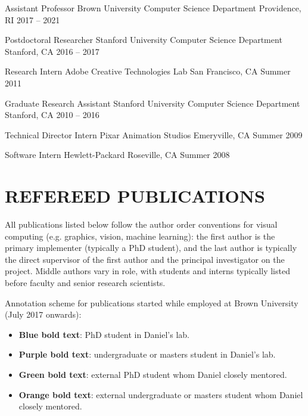 \documentclass[line,margin]{res}
\begin{document}
\begin{resume}
\job
{Assistant Professor}
{Brown University Computer Science Department}
{Providence, RI}
{2017 -- 2021}

\job
{Postdoctoral Researcher}
{Stanford University Computer Science Department}
{Stanford, CA}
{2016 -- 2017}

\job
{Research Intern}
{Adobe Creative Technologies Lab}
{San Francisco, CA}
{Summer 2011}

\job
{Graduate Research Assistant}
{Stanford University Computer Science Department}
{Stanford, CA}
{2010 -- 2016}

\job
{Technical Director Intern}
{Pixar Animation Studios}
{Emeryville, CA}
{Summer 2009}

\job
{Software Intern}
{Hewlett-Packard}
{Roseville, CA}
{Summer 2008}


\section{REFEREED PUBLICATIONS}

\newcommand{\pubtitle}[1]{\textbf{#1}}
\newcommand{\pubauthors}[1]{#1}
\newcommand{\pubvenue}[1]{\emph{#1}}
\newcommand{\pubaward}[1]{\textsc{#1}}

All publications listed below follow the author order conventions for visual computing (e.g. graphics, vision, machine learning): the first author is the primary implementer (typically a PhD student), and the last author is typically the direct supervisor of the first author and the principal investigator on the project.
Middle authors vary in role, with students and interns typically listed before faculty and senior research scientists.

\newcommand{\myphd}[1]{\textbf{\color{tblue}#1}}
\newcommand{\mystud}[1]{\textbf{\color{tpurple}#1}}
\newcommand{\extphd}[1]{\textbf{\color{tgreen}#1}}
\newcommand{\extstud}[1]{\textbf{\color{torange}#1}}

Annotation scheme for publications started while employed at Brown University (July 2017 onwards):
\begin{itemize}
	\item \myphd{Blue bold text}: PhD student in Daniel's lab.
	\item \mystud{Purple bold text}: undergraduate or masters student in Daniel's lab.
	\item \extphd{Green bold text}: external PhD student whom Daniel closely mentored.
	\item \extstud{Orange bold text}: external undergraduate or masters student whom Daniel closely mentored.
\end{itemize}


\end{resume}
\end{document}
